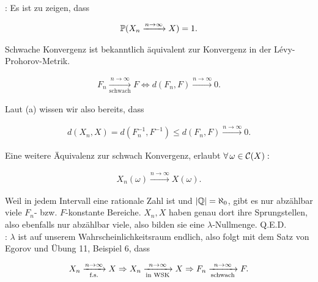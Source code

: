 \begin{solution}
\say{$\Rightarrow$}: Es ist zu zeigen, dass

\begin{align*}
  \P(X_n \xrightarrow{n \to \infty} X) = 1.
\end{align*}

Schwache Konvergenz ist bekanntlich äquivalent zur Konvergenz in der Lévy-Prohorov-Metrik.

\begin{align*}
  F_n \xrightarrow[\text{schwach}]{n \to \infty} F
  \Leftrightarrow
  d(F_n, F) \xrightarrow{n \to \infty} 0.
\end{align*}

Laut (a) wissen wir also bereits, dass

\begin{align*}
  d(X_n, X) =
  d(F_n^{-1}, F^{-1}) \leq
  d(F_n, F) \xrightarrow{n \to \infty} 0.
  \label{schwache_konvergenz}
\end{align*}

Eine weitere Äquivalenz zur schwach Konvergenz, erlaubt $\Forall \omega \in \mathcal{C}(X):$

\begin{align*}
  X_n(\omega) \xrightarrow{n \to \infty} X(\omega).
\end{align*}

Weil in jedem Intervall eine rationale Zahl ist und $|\Q| = \aleph_0$, gibt es nur abzählbar viele $F_n$- bzw. $F$-konstante Bereiche. $X_n, X$ haben genau dort ihre Sprungstellen, also ebenfalls nur abzählbar viele, also bilden sie eine $\lambda$-Nullmenge. Q.E.D. \\

\say{$\Leftarrow$}: $\lambda$ ist auf unserem Wahrscheinlichkeitsraum endlich, also folgt mit dem Satz von Egorov und Übung 11, Beispiel 6, dass

\begin{align*}
  X_n \xrightarrow[\fastsicher]{n \to \infty} X
  \Rightarrow
  X_n \xrightarrow[\text{in WSK}]{n \to \infty} X
  \Rightarrow
  F_n \xrightarrow[\text{schwach}]{n \to \infty} F.
\end{align*}

\end{solution}
